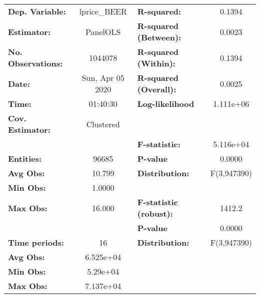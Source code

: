 \documentclass{report}a
\begin{document}
\begin{center}
\begin{tabular}{lclc}
\toprule
\textbf{Dep. Variable:}       &    lprice\_BEER    & \textbf{  R-squared:         }   &      0.1394      \\
\textbf{Estimator:}           &      PanelOLS      & \textbf{  R-squared (Between):}  &      0.0023      \\
\textbf{No. Observations:}    &      1044078       & \textbf{  R-squared (Within):}   &      0.1394      \\
\textbf{Date:}                &  Sun, Apr 05 2020  & \textbf{  R-squared (Overall):}  &      0.0025      \\
\textbf{Time:}                &      01:40:30      & \textbf{  Log-likelihood     }   &    1.111e+06     \\
\textbf{Cov. Estimator:}      &     Clustered      & \textbf{                     }   &                  \\
\textbf{}                     &                    & \textbf{  F-statistic:       }   &    5.116e+04     \\
\textbf{Entities:}            &       96685        & \textbf{  P-value            }   &      0.0000      \\
\textbf{Avg Obs:}             &       10.799       & \textbf{  Distribution:      }   &   F(3,947390)    \\
\textbf{Min Obs:}             &       1.0000       & \textbf{                     }   &                  \\
\textbf{Max Obs:}             &       16.000       & \textbf{  F-statistic (robust):} &      1412.2      \\
\textbf{}                     &                    & \textbf{  P-value            }   &      0.0000      \\
\textbf{Time periods:}        &         16         & \textbf{  Distribution:      }   &   F(3,947390)    \\
\textbf{Avg Obs:}             &     6.525e+04      & \textbf{                     }   &                  \\
\textbf{Min Obs:}             &      5.29e+04      & \textbf{                     }   &                  \\
\textbf{Max Obs:}             &     7.137e+04      & \textbf{                     }   &                  \\
\bottomrule
\end{tabular}
\begin{tabular}{lcccccc}

\end{tabular}
\end{center}
\end{document}
